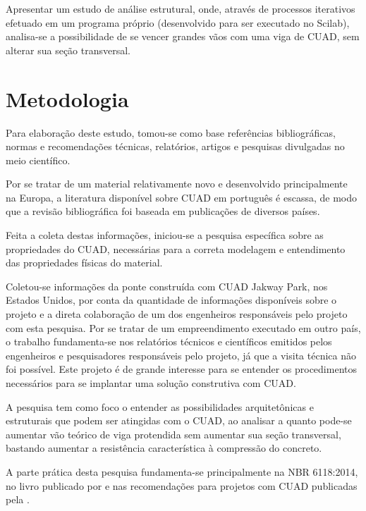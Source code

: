 Apresentar um estudo de análise estrutural, onde, através de processos iterativos efetuado em um programa próprio (desenvolvido para ser executado no Scilab), analisa-se a possibilidade de se vencer grandes vãos com uma viga de CUAD, sem alterar sua seção transversal.

\chapter{Metodologia}

Para elaboração deste estudo, tomou-se como base referências bibliográficas, normas e recomendações técnicas, relatórios, artigos e pesquisas divulgadas no meio científico.

Por se tratar de um material relativamente novo e desenvolvido principalmente na Europa, a literatura disponível sobre CUAD	 em português é escassa, de modo que a revisão bibliográfica foi baseada em publicações de diversos países.


Feita a coleta destas informações, iniciou-se a pesquisa específica sobre as propriedades do CUAD, necessárias para a correta modelagem e entendimento das propriedades físicas do material.

Coletou-se informações da ponte construída com CUAD Jakway Park, nos Estados Unidos, por conta da quantidade de informações disponíveis sobre o projeto e a direta colaboração de um dos engenheiros responsáveis pelo projeto com esta pesquisa. Por se tratar de um empreendimento executado em outro país, o trabalho fundamenta-se nos relatórios técnicos e científicos emitidos pelos engenheiros e pesquisadores responsáveis pelo projeto, já que a visita técnica não foi possível. Este projeto é de grande interesse para se entender os procedimentos necessários para se implantar uma solução construtiva com CUAD.

A pesquisa tem como foco o entender as possibilidades arquitetônicas e estruturais que podem ser atingidas com o CUAD, ao analisar a quanto pode-se aumentar vão teórico de viga protendida sem aumentar sua seção transversal, bastando aumentar a resistência característica à compressão do concreto.

A parte prática desta pesquisa fundamenta-se principalmente na NBR 6118:2014, no livro publicado por  e nas recomendações para projetos com CUAD publicadas pela .

